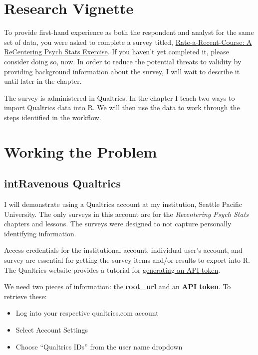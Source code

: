 \documentclass[
  11pt,
]{book}
\providecommand{\tightlist}{%
  \setlength{\itemsep}{0pt}\setlength{\parskip}{0pt}}
\begin{document}
\hypertarget{research-vignette}{%
\section{Research Vignette}\label{research-vignette}}

To provide first-hand experience as both the respondent and analyst for the same set of data, you were asked to complete a survey titled, \href{https://spupsych.az1.qualtrics.com/jfe/form/SV_b2cClqAlLGQ6nLU}{Rate-a-Recent-Course: A ReCentering Psych Stats Exercise}. If you haven't yet completed it, please consider doing so, now. In order to reduce the potential threats to validity by providing background information about the survey, I will wait to describe it until later in the chapter.

The survey is administered in Qualtrics. In the chapter I teach two ways to import Qualtrics data into R. We will then use the data to work through the steps identified in the workflow.

\hypertarget{working-the-problem}{%
\section{Working the Problem}\label{working-the-problem}}

\hypertarget{intravenous-qualtrics}{%
\subsection{intRavenous Qualtrics}\label{intravenous-qualtrics}}

I will demonstrate using a Qualtrics account at my institution, Seattle Pacific University. The only surveys in this account are for the \emph{Recentering Psych Stats} chapters and lessons. The surveys were designed to not capture personally identifying information.

Access credentials for the institutional account, individual user's account, and survey are essential for getting the survey items and/or results to export into R. The Qualtrics website provides a tutorial for \href{https://www.qualtrics.com/support/integrations/api-integration/overview/\#GeneratingAnAPIToken}{generating an API token}.

We need two pieces of information: the \textbf{root\_url} and an \textbf{API token}. To retrieve these:

\begin{itemize}
\tightlist
\item
  Log into your respective qualtrics.com account
\item
  Select Account Settings
\item
  Choose ``Qualtrics IDs'' from the user name dropdown
\end{itemize}
\end{document}
